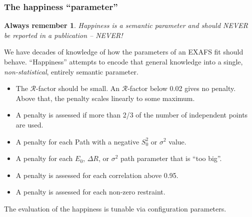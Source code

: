 \documentclass[10pt, xcolor=x11names, compress, handout]{beamer}
\newtheorem{remember}[theorem]{Always remember}
\begin{document}
\begin{frame}
  \frametitle{The happiness ``parameter''}
  \small
  \begin{remember}
    Happiness is a semantic parameter and should NEVER be reported in
    a publication -- \alert{NEVER!}
  \end{remember}
  We have decades of knowledge of how the parameters of an EXAFS fit
  should behave.  ``Happiness'' attempts to encode that general
  knowledge into a single, \emph{non-statistical}, entirely semantic parameter.
  \begin{itemize}
  \item The $\mathcal{R}$-factor should be small.  An
    $\mathcal{R}$-factor below 0.02 gives no penalty. Above that, the
    penalty scales linearly to some maximum.
  \item A penalty is assessed if more than 2/3 of the number of
    independent points are used.
  \item A penalty for each Path with a negative $S_0^2$ or $\sigma^2$
    value.
  \item A penalty for each $E_0$, $\Delta R$, or $\sigma^2$ path
    parameter that is ``too big''.
  \item A penalty is assessed for each correlation above 0.95.
  \item A penalty is assessed for each non-zero restraint.
  \end{itemize}
  The evaluation of the happiness is tunable via configuration parameters.
\end{frame}
\end{document}
